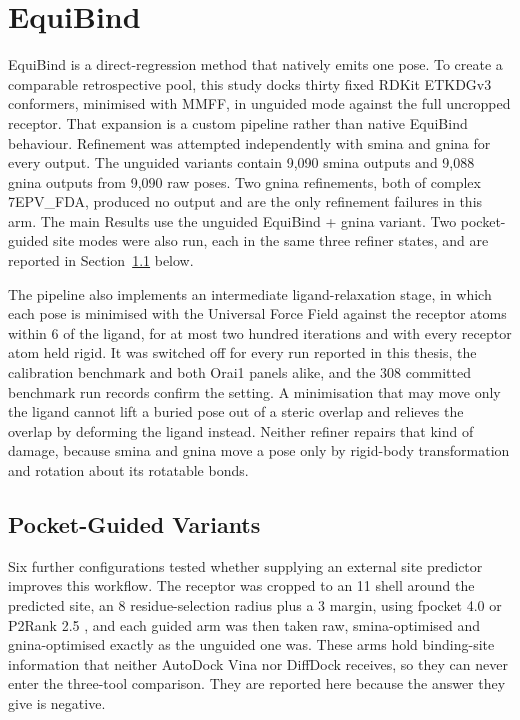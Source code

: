 \hypertarget{equibind-2}{%
\section{EquiBind}\label{equibind-2}}

EquiBind \cite{ref010} is a direct-regression method that natively emits one pose. To create a comparable retrospective pool, this study docks thirty fixed RDKit ETKDGv3 conformers, minimised with MMFF, in unguided mode against the full uncropped receptor. That expansion is a custom pipeline rather than native EquiBind behaviour. Refinement was attempted independently with smina and gnina for every output. The unguided variants contain 9,090 smina outputs and 9,088 gnina outputs from 9,090 raw poses. Two gnina refinements, both of complex 7EPV\_FDA, produced no output and are the only refinement failures in this arm. The main Results use the unguided EquiBind + gnina variant. Two pocket-guided site modes were also run, each in the same three refiner states, and are reported in Section~\ref{equibind-pocket-guided} below.

The pipeline also implements an intermediate ligand-relaxation stage, in which each pose is minimised with the Universal Force Field against the receptor atoms within 6\angstrom{} of the ligand, for at most two hundred iterations and with every receptor atom held rigid. It was switched off for every run reported in this thesis, the calibration benchmark and both Orai1 panels alike, and the 308 committed benchmark run records confirm the setting. A minimisation that may move only the ligand cannot lift a buried pose out of a steric overlap and relieves the overlap by deforming the ligand instead. Neither refiner repairs that kind of damage, because smina and gnina move a pose only by rigid-body transformation and rotation about its rotatable bonds.

\hypertarget{equibind-pocket-guided}{%
\subsection{Pocket-Guided Variants}\label{equibind-pocket-guided}}

Six further configurations tested whether supplying an external site predictor improves this workflow. The receptor was cropped to an 11\angstrom{} shell around the predicted site, an 8\angstrom{} residue-selection radius plus a 3\angstrom{} margin, using fpocket 4.0 \cite{ref060} or P2Rank 2.5 \cite{ref061}, and each guided arm was then taken raw, smina-optimised and gnina-optimised exactly as the unguided one was. These arms hold binding-site information that neither AutoDock Vina nor DiffDock receives, so they can never enter the three-tool comparison. They are reported here because the answer they give is negative.

